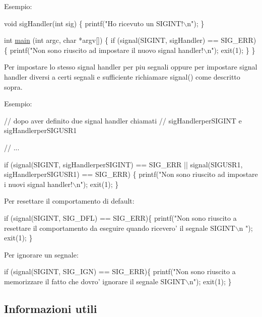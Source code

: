 Esempio\+: 
\begin{DoxyCode}
\textcolor{keywordtype}{void} sigHandler(\textcolor{keywordtype}{int} sig) \{
    printf(\textcolor{stringliteral}{"Ho ricevuto un SIGINT!\(\backslash\)n"});
\}


\textcolor{keywordtype}{int} \hyperlink{client_8h_a0ddf1224851353fc92bfbff6f499fa97}{main} (\textcolor{keywordtype}{int} argc, \textcolor{keywordtype}{char} *argv[]) \{
    \textcolor{keywordflow}{if} (signal(SIGINT, sigHandler) == SIG\_ERR) \{
        printf(\textcolor{stringliteral}{"Non sono riuscito ad impostare il nuovo signal handler!\(\backslash\)n"});
        exit(1);
    \}
\}
\end{DoxyCode}


Per impostare lo stesso signal handler per piu\textquotesingle{} segnali oppure per impostare signal handler diversi a certi segnali e\textquotesingle{} sufficiente richiamare {\ttfamily signal()} come descritto sopra.

Esempio\+: 
\begin{DoxyCode}
\textcolor{comment}{// dopo aver definito due signal handler chiamati}
\textcolor{comment}{// sigHandlerperSIGINT e sigHandlerperSIGUSR1}

\textcolor{comment}{// ...}

\textcolor{keywordflow}{if} (signal(SIGINT, sigHandlerperSIGINT) == SIG\_ERR ||
    signal(SIGUSR1, sigHandlerperSIGUSR1) == SIG\_ERR) \{
    printf(\textcolor{stringliteral}{"Non sono riuscito ad impostare i nuovi signal handler!\(\backslash\)n"});
    exit(1);
\}
\end{DoxyCode}


Per resettare il comportamento di default\+: 
\begin{DoxyCode}
\textcolor{keywordflow}{if} (signal(SIGINT, SIG\_DFL) == SIG\_ERR)\{
    printf(\textcolor{stringliteral}{"Non sono riuscito a resettare il comportamento da eseguire quando ricevero' il segnale SIGINT\(\backslash\)n
      "});
    exit(1);
\}
\end{DoxyCode}


Per ignorare un segnale\+: 
\begin{DoxyCode}
\textcolor{keywordflow}{if} (signal(SIGINT, SIG\_IGN) == SIG\_ERR)\{
    printf(\textcolor{stringliteral}{"Non sono riuscito a memorizzare il fatto che dovro' ignorare il segnale SIGINT\(\backslash\)n"});
    exit(1);
\}
\end{DoxyCode}


\subsection*{Informazioni utili}


